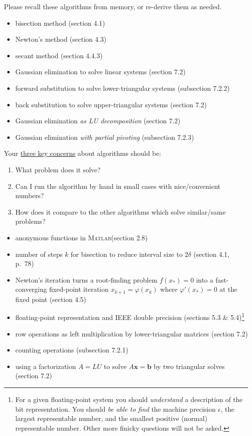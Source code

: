 \documentclass[12pt]{amsart}
\newcommand{\bb}{\mathbf{b}}
\newcommand{\bx}{\mathbf{x}}
\newcommand{\eps}{\epsilon}
\newcommand{\Matlab}{\textsc{Matlab}\xspace}
\begin{document}
  Please recall these algorithms from memory, or re-derive them as needed.
  \begin{itemize}
  \item  bisection method (section 4.1)
  \item  Newton's method (section 4.3)
  \item  secant method (section 4.4.3)
  \item  Gaussian elimination to solve linear systems (section 7.2)
  \item  forward substitution to solve lower-triangular systems (subsection 7.2.2)
  \item  back substitution to solve upper-triangular systems (section 7.2)
  \item  Gaussian elimination \emph{as LU decomposition} (section 7.2)
  \item  Gaussian elimination \emph{with partial pivoting} (subsection 7.2.3)
  \end{itemize}
Your \underline{three key concerns} about algorithms should be:
\begin{enumerate}
\item What problem does it solve?
\item Can I run the algorithm by hand in small cases with nice/convenient numbers?
\item How does it compare to the other algorithms which solve similar/same problems?
\end{enumerate}

  \begin{itemize}
  \item anonymous functions in \Matlab (section 2.8)
  \item number of steps $k$ for bisection to reduce interval size to $2\delta$ (section 4.1, p.~78)
  \item Newton's iteration turns a root-finding problem $f(x_*)=0$ into a fast-converging fixed-point iteration $x_{k+1} = \varphi(x_k)$ where $\varphi'(x_*)=0$ at the fixed point (section 4.5)
  \item floating-point representation and IEEE double precision (sections 5.3 \& 5.4)\footnote{For a given floating-point system you should \emph{understand} a description of the bit representation.  You should \emph{be able to find} the machine precision $\eps$, the largest representable number, and the smallest positive (normal) representable number.  Other more finicky questions will not be asked.}
  \item row operations as left multiplication by lower-triangular matrices (section 7.2)
  \item counting operations (subsection 7.2.1)
  \item using a factorization $A=LU$ to solve $A\bx=\bb$ by two triangular solves (section 7.2)
  \end{itemize}
\end{document}

